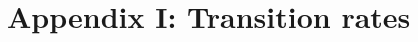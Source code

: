 \documentclass[11pt]{article}
\begin{document}

\renewcommand{\theequation}{A\arabic{equation}}
\setcounter{equation}{0}

\newpage{}

\section*{Appendix I: Transition rates} 
\end{document}

